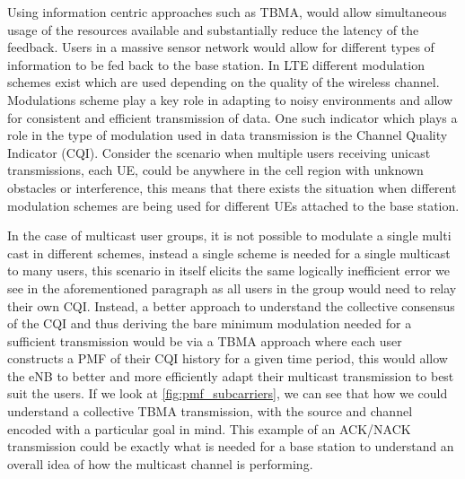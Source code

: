 \documentclass{article}
\begin{document}
Using information centric approaches such as TBMA, would allow simultaneous usage of the resources available and substantially reduce the latency of the feedback. Users in a massive sensor network would allow for different types of information to be fed back to the base station. In LTE different modulation schemes exist which are used depending on the quality of the wireless channel. Modulations scheme play a key role in adapting to noisy environments and allow for consistent and efficient transmission of data. One such indicator which plays a role in the type of modulation used in data transmission is the Channel Quality Indicator (CQI). Consider the scenario when multiple users receiving unicast transmissions, each UE, could be anywhere in the cell region with unknown obstacles or interference, this means that there exists the situation when different modulation schemes are being used for different UEs attached to the base station. 

In the case of multicast user groups, it is not possible to modulate a single multi cast in different schemes, instead a single scheme is needed for a single multicast to many users, this scenario in itself elicits the same logically inefficient error we see in the aforementioned paragraph as all users in the group would need to relay their own CQI. Instead, a better approach to understand the collective consensus of the CQI and thus deriving the bare minimum modulation needed for a sufficient transmission would be via a TBMA approach where each user constructs a PMF of their CQI history for a given time period, this would allow the eNB to better and more efficiently adapt their multicast transmission to best suit the users. If we look at \cref{fig:pmf_subcarriers}, we can see that how we could understand a collective TBMA transmission, with the source and channel encoded with a particular goal in mind. This example of an ACK/NACK transmission could be exactly what is needed for a base station to understand an overall idea of how the multicast channel is performing. 
\end{document}
